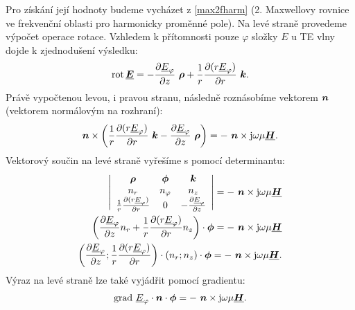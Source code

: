 \documentclass[12pt,a4paper,oneside]{article}
\numberwithin{equation}{section} %
\numberwithin{figure}{section} %
\numberwithin{table}{section} %
\newcommand{\mj}{\mathrm{j}} %
\renewcommand{\vec}[1]{\mbox{\boldmath$#1$}} %
\newcommand{\faz}[1]{{\underline{#1}}} %
\newcommand{\grad}{\mathrm{grad}\ }
\newcommand{\rot}{\mathrm{rot}\ }
\begin{document}
Pro získání její hodnoty budeme vycházet z \ref{max2fharm} (2. Maxwellovy rovnice ve frekvenční oblasti pro harmonicky proměnné pole). Na levé straně provedeme výpočet operace rotace. Vzhledem k přítomnosti pouze $\varphi$ složky $E$ u TE vlny dojde k zjednodušení výsledku:
\begin{equation}
\rot \! \faz{\vec{E}} = - \frac{\partial \faz{E} _{\varphi}}{\partial z} ~ \vec{\rho} + \frac{1}{r} \frac{\partial ( r \faz{E} _{\varphi} ) }{\partial r} ~ \vec{k} .
\end{equation}
Právě vypočtenou levou, i pravou stranu, následně roznásobíme vektorem $\vec{n}$ (vektorem normálovým na rozhraní):
\begin{equation}
\vec{n} \times \left( \frac{1}{r} \frac{\partial ( r \faz{E} _{\varphi} ) }{\partial r} ~ \vec{k} - \frac{\partial \faz{E}_{\varphi}}{\partial z} ~ \vec{\rho} \right) = - ~ \vec{n} \times \mj \omega \mu \faz{\vec{H}} .
\end{equation}
Vektorový součin na levé straně vyřešíme s pomocí determinantu:
\begin{subequations}
\begin{align}
\left| 
\begin{array}{c c c}
\vec{\rho} & \vec{\phi} & \vec{k} \\ 
n_r & n_{\varphi} & n_z \\
\frac{1}{r} \frac{\partial ( r \faz{E} _{\varphi} ) }{\partial r} & 0 & - \frac{\partial \faz{E} _{\varphi}}{\partial z}
\end{array}
\right|
= - ~ \vec{n} \times \mj \omega \mu \faz{\vec{H}} 
\\
\left( \frac{\partial \faz{E}_{\varphi}}{\partial z} n_{r} + \frac{1}{r} \frac{\partial ( r \faz{E} _{\varphi} ) }{\partial r} n_z \right) \cdot \vec{\phi} = - ~ \vec{n} \times \mj \omega \mu \faz{\vec{H}}
\\
\left( \frac{\partial \faz{E} _{\varphi}}{\partial z} ;\frac{1}{r} \frac{\partial ( r \faz{E} _{\varphi} ) }{\partial r} \right) \cdot \left( n_r; n_{z} \right) \cdot \vec{\phi} = - ~ \vec{n} \times \mj \omega \mu \faz{\vec{H}} .
\end{align}
\end{subequations}
Výraz na levé straně lze také vyjádřit pomocí gradientu:
\begin{equation}
\grad \faz{E} _{\varphi} \cdot \vec{n} \cdot \vec{\phi} = - ~ \vec{n} \times \mj \omega \mu \faz{\vec{H}} .
\end{equation}
\end{document}
